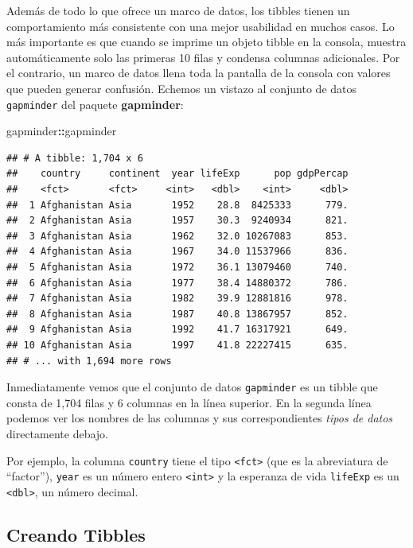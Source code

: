 \documentclass[
]{book}
\newenvironment{Shaded}{\begin{snugshade}}{\end{snugshade}}
\newcommand{\NormalTok}[1]{#1}
\newcommand{\OperatorTok}[1]{\textcolor[rgb]{0.81,0.36,0.00}{\textbf{#1}}}
\begin{document}
Además de todo lo que ofrece un marco de datos, los tibbles tienen un comportamiento más consistente con una mejor usabilidad en muchos casos. Lo más importante es que cuando se imprime un objeto tibble en la consola, muestra automáticamente solo las primeras 10 filas y condensa columnas adicionales. Por el contrario, un marco de datos llena toda la pantalla de la consola con valores que pueden generar confusión. Echemos un vistazo al conjunto de datos \texttt{gapminder} del paquete \textbf{gapminder}:

\begin{Shaded}
\begin{Highlighting}[]
\NormalTok{gapminder}\OperatorTok{::}\NormalTok{gapminder}
\end{Highlighting}
\end{Shaded}

\begin{verbatim}
## # A tibble: 1,704 x 6
##    country     continent  year lifeExp      pop gdpPercap
##    <fct>       <fct>     <int>   <dbl>    <int>     <dbl>
##  1 Afghanistan Asia       1952    28.8  8425333      779.
##  2 Afghanistan Asia       1957    30.3  9240934      821.
##  3 Afghanistan Asia       1962    32.0 10267083      853.
##  4 Afghanistan Asia       1967    34.0 11537966      836.
##  5 Afghanistan Asia       1972    36.1 13079460      740.
##  6 Afghanistan Asia       1977    38.4 14880372      786.
##  7 Afghanistan Asia       1982    39.9 12881816      978.
##  8 Afghanistan Asia       1987    40.8 13867957      852.
##  9 Afghanistan Asia       1992    41.7 16317921      649.
## 10 Afghanistan Asia       1997    41.8 22227415      635.
## # ... with 1,694 more rows
\end{verbatim}

Inmediatamente vemos que el conjunto de datos \texttt{gapminder} es un tibble que consta de 1,704 filas y 6 columnas en la línea superior. En la segunda línea podemos ver los nombres de las columnas y sus correspondientes \emph{tipos de datos} directamente debajo.

Por ejemplo, la columna \texttt{country} tiene el tipo \texttt{\textless{}fct\textgreater{}} (que es la abreviatura de ``factor''), \texttt{year} es un número entero \texttt{\textless{}int\textgreater{}} y la esperanza de vida \texttt{lifeExp} es un \texttt{\textless{}dbl\textgreater{}}, un número decimal.

\hypertarget{creando-tibbles}{%
\subsection{Creando Tibbles}\label{creando-tibbles}}
\end{document}
